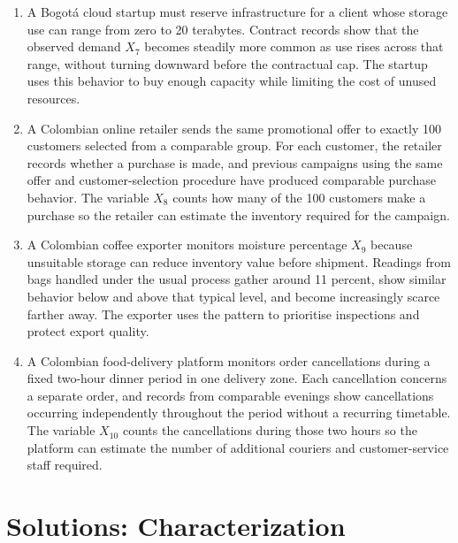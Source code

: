 \begin{enumerate}
		\item
		A Bogotá cloud startup must reserve infrastructure for a client whose storage use can range from zero to 20 terabytes. Contract records show that the observed demand \(X_7\) becomes steadily more common as use rises across that range, without turning downward before the contractual cap. The startup uses this behavior to buy enough capacity while limiting the cost of unused resources.
		
		\item
		A Colombian online retailer sends the same promotional offer to exactly 100 customers selected from a comparable group. For each customer, the retailer records whether a purchase is made, and previous campaigns using the same offer and customer-selection procedure have produced comparable purchase behavior. The variable \(X_8\) counts how many of the 100 customers make a purchase so the retailer can estimate the inventory required for the campaign.
		
		\item
		A Colombian coffee exporter monitors moisture percentage \(X_9\) because unsuitable storage can reduce inventory value before shipment. Readings from bags handled under the usual process gather around 11 percent, show similar behavior below and above that typical level, and become increasingly scarce farther away. The exporter uses the pattern to prioritise inspections and protect export quality.
		
		\item
		A Colombian food-delivery platform monitors order cancellations during a fixed two-hour dinner period in one delivery zone. Each cancellation concerns a separate order, and records from comparable evenings show cancellations occurring independently throughout the period without a recurring timetable. The variable \(X_{10}\) counts the cancellations during those two hours so the platform can estimate the number of additional couriers and customer-service staff required.
		
	\end{enumerate}
	
	
	\section*{Solutions: Characterization}
	

